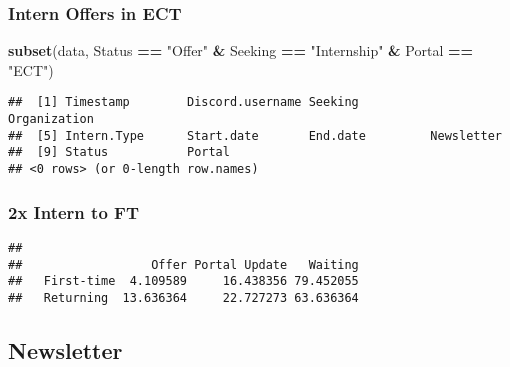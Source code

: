 \documentclass[
]{article}
\newenvironment{Shaded}{\begin{snugshade}}{\end{snugshade}}
\newcommand{\AttributeTok}[1]{\textcolor[rgb]{0.13,0.29,0.53}{#1}}
\newcommand{\DecValTok}[1]{\textcolor[rgb]{0.00,0.00,0.81}{#1}}
\newcommand{\FunctionTok}[1]{\textcolor[rgb]{0.13,0.29,0.53}{\textbf{#1}}}
\newcommand{\NormalTok}[1]{#1}
\newcommand{\OtherTok}[1]{\textcolor[rgb]{0.56,0.35,0.01}{#1}}
\newcommand{\SpecialCharTok}[1]{\textcolor[rgb]{0.81,0.36,0.00}{\textbf{#1}}}
\newcommand{\StringTok}[1]{\textcolor[rgb]{0.31,0.60,0.02}{#1}}
\begin{document}
\hypertarget{intern-offers-in-ect}{%
\subsubsection{Intern Offers in ECT}\label{intern-offers-in-ect}}

\begin{Shaded}
\begin{Highlighting}[]
\FunctionTok{subset}\NormalTok{(data, Status }\SpecialCharTok{==} \StringTok{"Offer"} \SpecialCharTok{\&}\NormalTok{ Seeking }\SpecialCharTok{==} \StringTok{"Internship"} \SpecialCharTok{\&}\NormalTok{ Portal }\SpecialCharTok{==} \StringTok{"ECT"}\NormalTok{)}
\end{Highlighting}
\end{Shaded}

\begin{verbatim}
##  [1] Timestamp        Discord.username Seeking          Organization    
##  [5] Intern.Type      Start.date       End.date         Newsletter      
##  [9] Status           Portal          
## <0 rows> (or 0-length row.names)
\end{verbatim}

\hypertarget{x-intern-to-ft}{%
\subsubsection{2x Intern to FT}\label{x-intern-to-ft}}

\begin{Shaded}
\end{Shaded}

\begin{verbatim}
##             
##                  Offer Portal Update   Waiting
##   First-time  4.109589     16.438356 79.452055
##   Returning  13.636364     22.727273 63.636364
\end{verbatim}

\hypertarget{newsletter}{%
\subsection{Newsletter}\label{newsletter}}
\end{document}
